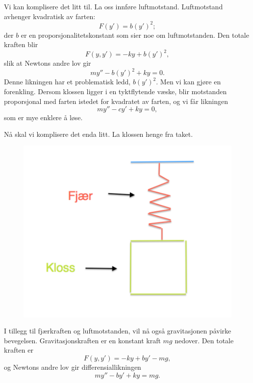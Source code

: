 Vi kan komplisere det litt til. La oss innf{\o}re luftmotstand. Luftmotstand avhenger kvadratisk av farten:
\begin{equation*}
F(y')=b(y')^{2};
\end{equation*}
der $b$ er en proporsjonalitetskonstant som sier noe om luftmotstanden. 
Den totale kraften blir
\begin{equation*}
F(y,y')=-ky+b(y')^{2},
\end{equation*}
slik at Newtons andre lov gir
\begin{equation*}
my''-b(y')^{2} +ky=0.
\end{equation*}
Denne likningen har et problematisk ledd, $b(y')^{2}$. Men vi kan gjøre en forenkling. 
Dersom klossen ligger i en tyktflytende væske, blir motstanden proporsjonal med farten istedet for kvadratet av farten, 
og vi får likningen
\begin{equation*}
my''-cy' +ky=0,
\end{equation*}
som er mye enklere å løse.



N{\aa} skal vi komplisere det enda litt. La klossen henge fra taket.
\begin{figure}[htbp]
  \begin{center}
	\includegraphics[scale=.4]{Hooke_2.pdf}
	\label{fig:Num1}
	\end{center}
\end{figure}
I tillegg til fj{\ae}rkraften og luftmotstanden, vil n{\aa} ogs{\aa} gravitasjonen p{\aa}virke bevegelsen. Gravitasjonskraften er en konstant kraft $mg$ nedover. Den totale kraften
er
\begin{equation*}
F(y,y')=-ky+by'-mg,
\end{equation*}
og Newtons andre lov gir differensiallikningen
\begin{equation*}
my''-by' +ky=mg.
\end{equation*}



